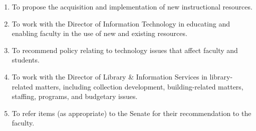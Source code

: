 \documentclass[letterpaper, 11pt]{article}
\begin{document}
\begin{enumerate}[label=\alph*)]
{\begin{enumerate}[label=\arabic*)]
								\item{To propose the acquisition and implementation of new instructional resources.}
								\item{To work with the Director of Information Technology in educating and enabling faculty in the use of new and existing resources.}
								\item{To recommend policy relating to technology issues that affect faculty and students.}
								\item{To work with the Director of Library \& Information Services in library-related matters, including collection development, building-related matters, staffing, programs, and budgetary issues.}
								\item{To refer items (as appropriate) to the Senate for their recommendation to the faculty.}
							\end{enumerate}
						}
					\end{enumerate}
\end{document}
